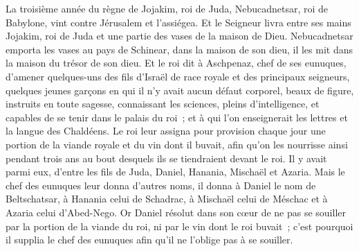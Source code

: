 \begin{multicols}{2}
\VerseOne{}La troisième année du règne de Jojakim, roi de Juda, Nebucadnetsar, roi de Babylone, vint contre Jérusalem et l'assiégea.
Et le Seigneur livra entre ses mains Jojakim, roi de Juda et une partie des vases de la maison de Dieu. Nebucadnetsar emporta les vases au pays de Schinear, dans la maison de son dieu, il les mit dans la maison du trésor de son dieu.
Et le roi dit à Aschpenaz, chef de ses eunuques, d'amener quelques-uns des fils d'Israël de race royale et des principaux seigneurs,
quelques jeunes garçons en qui il n'y avait aucun défaut corporel, beaux de figure, instruits en toute sagesse, connaissant les sciences, pleins d'intelligence, et capables de se tenir dans le palais du roi~; et à qui l'on enseignerait les lettres et la langue des Chaldéens.
Le roi leur assigna pour provision chaque jour une portion de la viande royale et du vin dont il buvait, afin qu'on les nourrisse ainsi pendant trois ans au bout desquels ils se tiendraient devant le roi.
Il y avait parmi eux, d'entre les fils de Juda, Daniel, Hanania, Mischaël et Azaria.
Mais le chef des eunuques leur donna d'autres noms, il donna à Daniel le nom de Beltschatsar, à Hanania celui de Schadrac, à Mischaël celui de Méschac et à Azaria celui d'Abed-Nego.
Or Daniel résolut dans son cœur de ne pas se souiller par la portion de la viande du roi, ni par le vin dont le roi buvait~; c'est pourquoi il supplia le chef des eunuques afin qu'il ne l'oblige pas à se souiller.

\end{multicols}
